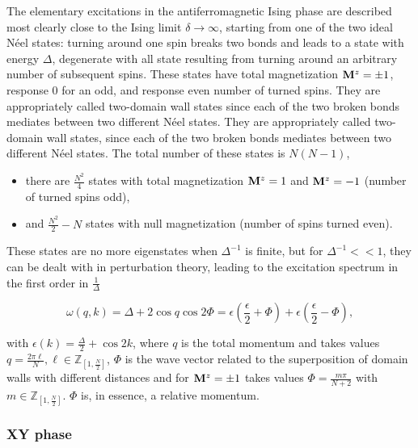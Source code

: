 \documentclass{homework}
\begin{document}
The elementary excitations in the antiferromagnetic Ising phase are described most clearly close to the Ising limit $\delta \rightarrow \infty$, starting from one of the two ideal Néel states: turning around one spin breaks two bonds and leads to a state with energy $\Delta$, degenerate with all state resulting from turning around an arbitrary number of subsequent spins. These states have total magnetization ${\bf M}^z = \pm 1$, response 0 for an odd, and response even number of turned spins. They are appropriately called two-domain wall states since each of the two broken bonds mediates between two different Néel states. They are appropriately called two-domain wall states, since each of the two broken bonds mediates between two different Néel states. The total number of these states is $N(N-1)$, 

\begin{itemize}
    \item there are $\frac{N^2}{4}$ states with total magnetization ${\bf M}^z= 1$ and ${\bf M}^z= -1$ (number of turned spins odd),
    \item and $\frac{N^2}{2}-N$ states with null magnetization (number of spins turned even). 
\end{itemize}

These states are no more eigenstates when $\Delta^{-1}$ is finite, but for $\Delta^{-1} << 1$, they can be dealt with in perturbation theory, leading to the excitation spectrum in the first order in $\frac{1}{\Delta}$

$$
    \omega(q,k) = \Delta + 2 \cos q \cos 2\Phi = \epsilon \left(\frac{\epsilon}{2} + \Phi\right) + \epsilon \left(\frac{\epsilon}{2} - \Phi\right),
$$

with $\epsilon(k) = \frac{\Delta}{2} + \cos 2k$, where $q$ is the total momentum and takes values $q = \frac{2\pi \ell}{N}, \ell \in \mathds{Z}_{[1, \frac{N}{2}]}$, $\Phi$ is the wave vector related to the superposition of domain walls with different distances and for ${\bf M}^z = \pm 1$ takes values $\Phi = \frac{m\pi}{N+2}$ with $m \in \mathds{Z}_{[1, \frac{N}{2}]}$. $\Phi$ is, in essence, a relative momentum. \\ 


\clearpage

\subsubsection{\textbf{XY phase}}
\end{document}

